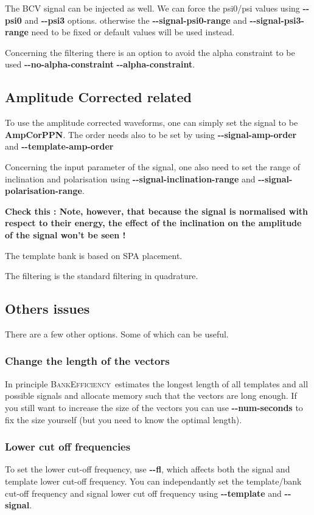 \documentclass[a4paper,10pt]{article}
\newcommand{\be}{\textsc{BankEfficiency}~}
\begin{document}
The BCV signal can be injected as well. We can force the psi0/psi values using \textbf{{-}{-}psi0} and \textbf{{-}{-}psi3} options. 
otherwise the \textbf{{-}{-}signal-psi0-range} and \textbf{{-}{-}signal-psi3-range} need to be fixed or default values will be used instead.

Concerning the filtering there is an option to avoid the alpha constraint to be used \textbf{{-}{-}no-alpha-constraint} \textbf{{-}{-}alpha-constraint}.



\subsection{Amplitude Corrected related}\label{ampcor}
To use the amplitude corrected waveforms, one can simply set the signal to be \textbf{AmpCorPPN}. The order needs also to be set by using \textbf{{-}{-}signal-amp-order}  and \textbf{{-}{-}template-amp-order}

Concerning the input parameter of the signal, one also need to set the range of inclination and polarisation using \textbf{{-}{-}signal-inclination-range} and \textbf{{-}{-}signal-polarisation-range}. 

\textbf{Check this : Note, however, that because the signal is normalised with respect to their energy, the effect of the inclination on the amplitude of the signal won't be seen !}

The template bank is based on SPA placement.

The filtering is the standard filtering in quadrature. 

\subsection{Others issues}\label{others}
There are a few other options. Some of which can be useful.
\subsubsection{Change the length of the vectors}
In principle \be estimates the longest length of all templates and all possible signals and allocate memory such that the vectors are long enough. If you still want to increase the size of the vectors  you can use \textbf{{-}{-}num-seconds} to fix the size yourself (but you need to know the optimal length).

\subsubsection{Lower cut off frequencies}
To set the lower cut-off frequency, use \textbf{{-}{-}fl}, which affects both the signal and template lower cut-off frequency. You can independantly set the template/bank cut-off frequency and signal lower cut off frequency using \textbf{{-}{-}template} and \textbf{{-}{-}signal}.
\end{document}
